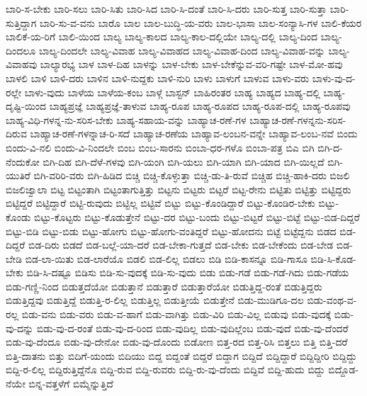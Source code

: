 {ಬಾರಿ-ಸ-ಬೇಕು
ಬಾರಿ-ಸಲು
ಬಾರಿ-ಸಿತು
ಬಾರಿ-ಸಿದ
ಬಾರಿ-ಸಿ-ದಂತೆ
ಬಾರಿ-ಸಿ-ದರು
ಬಾರಿ-ಸುತ್ತ
ಬಾರಿ-ಸುತ್ತಾ
ಬಾರಿ-ಸುತ್ತಿದ್ದಾಗ
ಬಾರಿ-ಸು-ವ-ವನು
ಬಾರೊ
ಬಾಲ
ಬಾಲ-ಬುದ್ಧಿ-ಯ-ವರು
ಬಾಲ-ಭಾಸಾ
ಬಾಲ-ಸಂನ್ಯಾಸಿ-ಗಳ
ಬಾಲಿ-ಕೆಯರ
ಬಾಲಿಕೆ-ಯ-ರಿಗೆ
ಬಾಲಿ-ಯಿಂದ
ಬಾಲ್ಯ
ಬಾಲ್ಯ-ಕಾಲದ
ಬಾಲ್ಯ-ಕಾಲ-ದಲ್ಲಿಯೇ
ಬಾಲ್ಯ-ದಲ್ಲಿ
ಬಾಲ್ಯ-ದಿಂದ
ಬಾಲ್ಯ-ದಿಂದಲೂ
ಬಾಲ್ಯ-ದಿಂದಲೇ
ಬಾಲ್ಯ-ವಿವಾಹ
ಬಾಲ್ಯ-ವಿವಾಹದ
ಬಾಲ್ಯ-ವಿವಾಹ-ದಿಂದ
ಬಾಲ್ಯ-ವಿವಾಹ-ವನ್ನು
ಬಾಲ್ಯ-ವಿವಾಹವು
ಬಾಲ್ಯಾರಭ್ಯ
ಬಾಳ
ಬಾಳ-ದಿಹ
ಬಾಳನ್ನು
ಬಾಳ-ಬೇಕು
ಬಾಳ-ಬೇಕೆನ್ನುವ-ವರಿ-ಗಷ್ಟೇ
ಬಾಳ-ಮೋ-ಹವು
ಬಾಳಲಿ
ಬಾಳಿ
ಬಾಳಿ-ದರು
ಬಾಳಿನ
ಬಾಳಿ-ನುದ್ದಕು
ಬಾಳಿ-ನುರಿ
ಬಾಳು
ಬಾಳುಗೆ
ಬಾಳುವ
ಬಾಳು-ವರು
ಬಾಳು-ವು-ದ-ರಲ್ಲೇ
ಬಾಳು-ವುದು
ಬಾಳೆಯ
ಬಾಳೆಯ-ಕಂಬ
ಬಾಳ್ಗೆ
ಬಾಸ್ಟನ್
ಬಾಹಿರಂತರ
ಬಾಹ್ಯ
ಬಾಹ್ಯದ
ಬಾಹ್ಯ-ದಲ್ಲಿ
ಬಾಹ್ಯ-ದೃಷ್ಟಿ-ಯಿಂದ
ಬಾಹ್ಯಪ್ರಜ್ಞೆ
ಬಾಹ್ಯಪ್ರಜ್ಞೆ-ತಾಳುವ
ಬಾಹ್ಯ-ರೂಪ
ಬಾಹ್ಯ-ರೂಪದ
ಬಾಹ್ಯ-ರೂಪ-ದಲ್ಲಿ
ಬಾಹ್ಯ-ರೂಪವು
ಬಾಹ್ಯ-ವಿಧಿ-ಗಳನ್ನ-ನು-ಸರಿಸ-ಬೇಕು
ಬಾಹ್ಯ-ಸಹಾಯ-ವನ್ನು
ಬಾಹ್ಯಾಚ-ರಣೆ-ಗಳ
ಬಾಹ್ಯಾಚ-ರಣೆ-ಗಳನ್ನನು-ಸರಿಸ-ದಿರುವ
ಬಾಹ್ಯಾಚ-ರಣೆ-ಗಳನ್ನಾಚ-ರಿ-ಸದೆ
ಬಾಹ್ಯಾಚ-ರಣೆಯ
ಬಾಹ್ಯಾವ-ಲಂಬನ-ವನ್ನೇ
ಬಾಹ್ಯಾವ-ಲಂಬ-ನವೆ
ಬಿಂದು
ಬಿಂದು-ವಿ-ನಲಿ
ಬಿಂದು-ವಿ-ನಿಂದಲೇ
ಬಿಂಬ
ಬಿಂಬ-ಸಾರನು
ಬಿಂಬಾ-ಧರ-ಗಳೊ
ಬಿಂಬಾ-ಪತ್ರ
ಬಿಎ
ಬಿಗಿ
ಬಿಗಿ-ದ-ನೆಂದುಕೋ
ಬಿಗಿ-ದಿಹ
ಬಿಗಿ-ದೆಳೆ-ಗಳವು
ಬಿಗಿ-ಯಂಗಿ
ಬಿಗಿ-ಯಲು
ಬಿಗಿ-ಯಾಗಿ
ಬಿಗಿ-ಯಾದ
ಬಿಗಿ-ಯಿಲ್ಲದೆ
ಬಿಗಿ-ಯುತಿರೆ
ಬಿಗಿ-ವರಿರಿ-ವರು
ಬಿಗಿ-ಹಿಡಿದ
ಬಿಚ್ಚಿ
ಬಿಚ್ಚಿ-ಕೊಳ್ಳುತ್ತಾ
ಬಿಚ್ಚಿ-ಡು-ತಿ-ರುವೆ
ಬಿಚ್ಚಿಹ
ಬಿಚ್ಚಿ-ಹಾಕಿ-ದರು
ಬಿಜಲಿ
ಬಿಜಲಿಜ್ವಾಲಾ
ಬಿಟ್ಟ
ಬಿಟ್ಟಂತಾಗಿ
ಬಿಟ್ಟಂತಾಗುತ್ತಿತ್ತು
ಬಿಟ್ಟನು
ಬಿಟ್ಟರು
ಬಿಟ್ಟರೆ
ಬಿಟ್ಟ-ರೇನು
ಬಿಟ್ಟಿತು
ಬಿಟ್ಟಿತ್ತು
ಬಿಟ್ಟಿದ್ದರು
ಬಿಟ್ಟಿದ್ದರೆ
ಬಿಟ್ಟಿದ್ದಾರೆ
ಬಿಟ್ಟಿ-ರುವುದು
ಬಿಟ್ಟಿಲ್ಲ
ಬಿಟ್ಟಿವೆ
ಬಿಟ್ಟು
ಬಿಟ್ಟು-ಕೊಂಡಿದ್ದಾರೆ
ಬಿಟ್ಟು-ಕೊಂಡಿರ-ಬೇಕು
ಬಿಟ್ಟು-ಕೊಂಡು
ಬಿಟ್ಟು-ಕೊಟ್ಟರು
ಬಿಟ್ಟು-ಕೊಡುತ್ತೇನೆ
ಬಿಟ್ಟು-ದರ
ಬಿಟ್ಟು-ಬಂದು
ಬಿಟ್ಟು-ಬಿಟ್ಟರೆ
ಬಿಟ್ಟು-ಬಿಟ್ಟೆ
ಬಿಟ್ಟು-ಬಿಡ-ದಿದ್ದರೆ
ಬಿಟ್ಟು-ಬಿಡಿ
ಬಿಟ್ಟು-ಬಿಡು
ಬಿಟ್ಟು-ಹೋಗು
ಬಿಟ್ಟು-ಹೋಗು-ವಂತಿದ್ದರೆ
ಬಿಟ್ಟು-ಹೋದನು
ಬಿಟ್ಟೆ
ಬಿಟ್ಟೆದ್ದನು
ಬಿಡದ
ಬಿಡ-ದಿದ್ದರೆ
ಬಿಡ-ದಿರು
ಬಿಡದೆ
ಬಿಡ-ಬಲ್ಲೆ-ಯಾ-ದರೆ
ಬಿಡ-ಬೇಕಾ-ಗುತ್ತದೆ
ಬಿಡ-ಬೇಕು
ಬಿಡ-ಬೇಕೆಂದು
ಬಿಡ-ಬೇಡ
ಬಿಡ-ಬೇಡಿ
ಬಿಡ-ಲಾ-ಯಿತು
ಬಿಡ-ಲಾರೆಯೊ
ಬಿಡಲಿ
ಬಿಡ-ಲಿಲ್ಲ
ಬಿಡಲು
ಬಿಡಿ
ಬಿಡಿ-ಕಾಸನ್ನೂ
ಬಿಡಿ-ಗಾಸೂ
ಬಿಡಿ-ಸಿ-ಕೊಡ-ಬೇಕು
ಬಿಡಿ-ಸಿ-ದಷ್ಟೂ
ಬಿಡಿಸು
ಬಿಡಿ-ಸು-ವುದಕ್ಕೆ
ಬಿಡಿ-ಸು-ವುದು
ಬಿಡು
ಬಿಡು-ಗಡೆ
ಬಿಡು-ಗಡೆ-ಗಿದು
ಬಿಡು-ಗಡೆಯ
ಬಿಡು-ಗಣ್ಣಿ-ನಿಂದ
ಬಿಡುತ್ತದೆಯೋ
ಬಿಡುತ್ತಾನೆ
ಬಿಡುತ್ತಾರೆ
ಬಿಡುತ್ತಾರೆಯೋ
ಬಿಡುತ್ತಿದ್ದ-ರಂತೆ
ಬಿಡುತ್ತಿದ್ದರು
ಬಿಡುತ್ತಿದ್ದವು
ಬಿಡುತ್ತಿದ್ದೆ
ಬಿಡುತ್ತಿ-ರ-ಲಿಲ್ಲ
ಬಿಡುತ್ತಿಲ್ಲ
ಬಿಡುತ್ತೀಯೆ
ಬಿಡುತ್ತೇನೆ
ಬಿಡು-ಮುಡಿಗೂ-ದಲ
ಬಿಡು-ವಂಥ-ವ-ರಲ್ಲ
ಬಿಡು-ವನು
ಬಿಡು-ವರು
ಬಿಡು-ವ-ಹಾಗೆ
ಬಿಡು-ವಾಗಿತ್ತು
ಬಿಡು-ವಿರಿ
ಬಿಡು-ವಿಲ್ಲ
ಬಿಡುವು
ಬಿಡು-ವುದಕ್ಕೆ
ಬಿಡು-ವು-ದನ್ನು
ಬಿಡು-ವು-ದ-ರಂತೆ
ಬಿಡು-ವು-ದ-ರಿಂದ
ಬಿಡು-ವುದಿಲ್ಲ
ಬಿಡು-ವುದಿಲ್ಲೆಂಬ
ಬಿಡು-ವುದೆ
ಬಿಡು-ವು-ದೆಂದರೆ
ಬಿಡು-ವು-ದೆಂದೂ
ಬಿಡು-ವು-ದೇನೋ
ಬಿಡು-ವು-ದೊಂದು
ಬಿಡೋಣ
ಬಿತ್ತ-ರದ
ಬಿತ್ತ-ರಿಸಿ
ಬಿತ್ತಲು
ಬಿತ್ತಿ
ಬಿತ್ತಿ-ದರೆ
ಬಿತ್ತಿ-ದಾತನು
ಬಿತ್ತು
ಬಿದಿಗೆ-ಯಂದು
ಬಿದಿಯು
ಬಿದ್ದ
ಬಿದ್ದಂತೆ
ಬಿದ್ದರೆ
ಬಿದ್ದಾಗ
ಬಿದ್ದಿದೆ
ಬಿದ್ದಿದ್ದಾರೆ
ಬಿದ್ದಿದ್ದೀರಿ
ಬಿದ್ದಿದ್ದು
ಬಿದ್ದಿ-ರ-ಲಿಲ್ಲ
ಬಿದ್ದಿರುತ್ತಿದ್ದೆನೊ
ಬಿದ್ದಿ-ರುವ
ಬಿದ್ದಿ-ರುವರು
ಬಿದ್ದಿ-ರು-ವು-ದೆಂದು
ಬಿದ್ದಿವೆ
ಬಿದ್ದಿ-ಹುದು
ಬಿದ್ದು
ಬಿದ್ದೊಡ-ನೆಯೇ
ಬಿನ್ನ-ವತ್ತಳೆಗೆ
ಬಿಮ್ಮೆನ್ನುತ್ತಿದೆ
}
